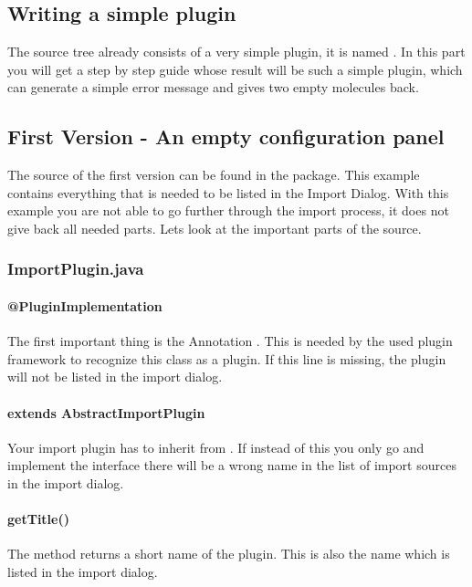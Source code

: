 \subsection{Writing a simple plugin}
The source tree already consists of a very simple plugin, it is named . In this part you will get a step by step guide whose result will be such a simple plugin, which can generate a simple error message and gives two empty molecules back.

\subsection{First Version - An empty configuration panel}
The source of the first version can be found in the  package. This example contains everything that is needed to be listed in the Import Dialog. With this example you are not able to go further through the import process, it does not give back all needed parts. Lets look at the important parts of the source.

\subsubsection{ImportPlugin.java}
\paragraph{@PluginImplementation}
The first important thing is the Annotation . This is needed by the used plugin framework to recognize this class as a plugin. If this line is missing, the plugin will not be listed in the import dialog.

\paragraph{extends AbstractImportPlugin}
Your import plugin has to inherit from . If instead of this you only go and implement the  interface there will be a wrong name in the list of import sources in the import dialog.

\paragraph{getTitle()}
The  method returns a short name of the plugin. This is also the name which is listed in the import dialog.

